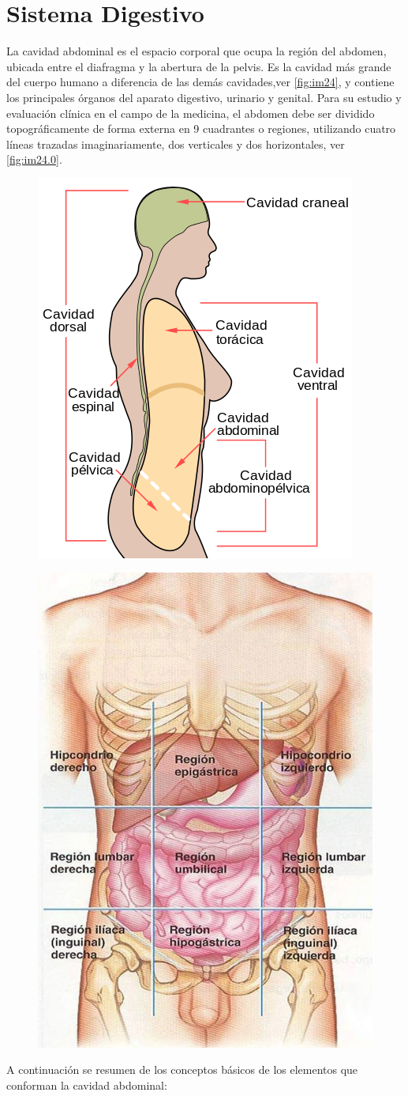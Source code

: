 \section{Sistema Digestivo}
La cavidad abdominal es el espacio corporal que ocupa la región del abdomen, ubicada entre el diafragma y la abertura de la pelvis. 
Es la cavidad más grande del cuerpo humano 
a diferencia de las demás cavidades,ver \ref{fig:im24}, y 
contiene los principales órganos del aparato digestivo, urinario y genital.
Para su estudio y evaluación clínica en el campo de la medicina, 
el abdomen debe ser dividido topográficamente de forma externa en 9 
cuadrantes o regiones, utilizando cuatro líneas 
trazadas imaginariamente, dos verticales y dos horizontales, ver \ref{fig:im24.0}.\cite{web12}
\begin{figure}[H]
 \begin{center}
  \includegraphics[width = .3\textwidth]{source/images/image56.png}
 \end{center} 
\end{figure}
\begin{figure}[H]
	\begin{center}
 		\includegraphics[width = .3\textwidth]{v3/images/image1.jpg}
	\end{center} 
\end{figure}
A continuación se resumen de los conceptos básicos de los elementos que conforman la cavidad abdominal\cite{pro2012anatomia}:
